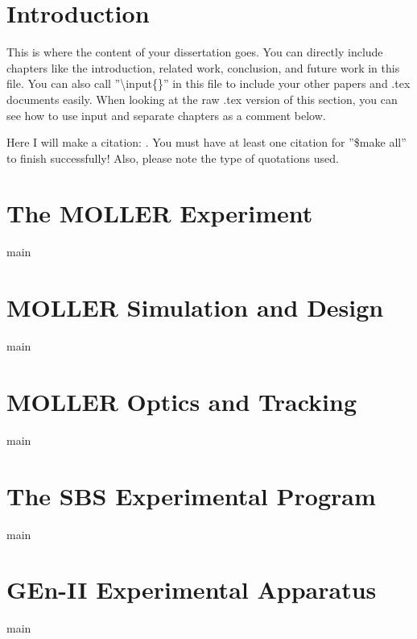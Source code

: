 \chapter{Introduction}
This is where the content of your dissertation goes.  You can directly include chapters like the introduction, related work, conclusion, and future work in this file.  You can also call ''\textbackslash input\{\}'' in this file to include your other papers and .tex documents easily.  When looking at the raw .tex version of this section, you can see how to use input and separate chapters as a comment below.

Here I will make a citation: \cite{mobile_marketshare}.  You must have at least one citation for ''\$make all'' to finish successfully!  Also, please note the type of quotations used.




%


\chapter{The MOLLER Experiment}
\label{cht:MOLLER}
{main}
\setcounter{equation}{0}
\cleardoublepage

\chapter{MOLLER Simulation and Design}
\label{cht:MOLLER_sim_des}
{main}
\setcounter{equation}{0}
\cleardoublepage

\chapter{MOLLER Optics and Tracking}
\label{cht:MOLLER_optics}
{main}
\setcounter{equation}{0}
\cleardoublepage


\chapter{The SBS Experimental Program}
\label{cht:SBS}
{main}
\setcounter{equation}{0}
\cleardoublepage

\chapter{GEn-II Experimental Apparatus}
\label{cht:GEnApp}
{main}
\setcounter{equation}{0}
\cleardoublepage

